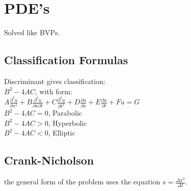 \section{PDE's}
Solved like BVPs.
\subsection*{Classification Formulas}
Discriminant gives classification:\\ $B^2 - 4 A C$, with form:\\
$ A \frac{\partial^2 u}{\partial x^2} + B \frac{\partial^2 u}{\partial x \partial t} + C \frac{\partial^2 u}{\partial t^2} + D \frac{\partial u}{\partial x} + E \frac{\partial u}{\partial t} + F u = G$\\
$B^2 - 4 A C = 0 $, Parabolic\\
$B^2 - 4 A C > 0 $, Hyperbolic\\
$B^2 - 4 A C < 0 $, Elliptic\\ 

\subsection*{Crank-Nicholson}


the general form of the problem uses the equation $s= \frac{\Delta x^2}{\Delta t}$.
